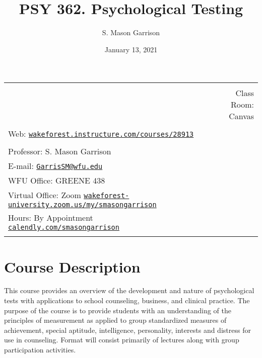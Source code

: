 \documentclass[11pt,]{article}
\title{PSY 362. Psychological Testing}
\author{S. Mason Garrison}
\date{January 13, 2021}
\begin{document}
		\maketitle
	

		\thispagestyle{firststyle}



\noindent \begin{tabular*}{\textwidth}{ @{\extracolsep{\fill}} lr @{\extracolsep{\fill}}}
\hline\\
    &  Class Room: Canvas
%
\\\hline\\
%
 Web: \href{https://wakeforest.instructure.com/courses/28913}{\tt wakeforest.instructure.com/courses/28913}&  \\ %
&  \\
Professor: S. Mason Garrison \\

E-mail: \texttt{\href{mailto:GarrisSM@wfu.edu}{\nolinkurl{GarrisSM@wfu.edu}}}  \\

WFU Office: GREENE 438   \\
Virtual Office: Zoom
\href{https://wakeforest-university.zoom.us/my/smasongarrison}{\tiny\tt wakeforest-university.zoom.us/my/smasongarrison}   \\
Hours: By Appointment
\href{https://calendly.com/smasongarrison/}{\small\tt calendly.com/smasongarrison}  \\


	&  \\
	\hline
\end{tabular*}

\vspace{2mm}

\hypertarget{course-description}{%
\section{Course Description}\label{course-description}}

This course provides an overview of the development and nature of
psychological tests with applications to school counseling, business,
and clinical practice. The purpose of the course is to provide students
with an understanding of the principles of measurement as applied to
group standardized measures of achievement, special aptitude,
intelligence, personality, interests and distress for use in counseling.
Format will consist primarily of lectures along with group participation
activities.
\end{document}
